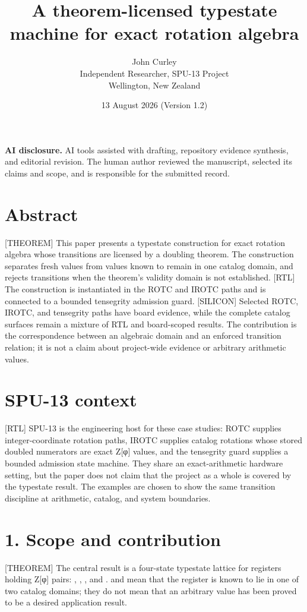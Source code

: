 \documentclass[11pt]{article}
\title{A theorem-licensed typestate machine for exact rotation algebra}
\author{John Curley\\Independent Researcher, SPU-13 Project\\Wellington, New Zealand}
\date{13 August 2026 (Version 1.2)}
\begin{document}
\maketitle
\noindent\textbf{AI disclosure.} AI tools assisted with drafting, repository evidence synthesis, and editorial revision. The human author reviewed the manuscript, selected its claims and scope, and is responsible for the submitted record.

\section{Abstract}

[THEOREM] This paper presents a typestate construction for exact rotation algebra whose transitions are licensed by a doubling theorem. The construction separates fresh values from values known to remain in one catalog domain, and rejects transitions when the theorem's validity domain is not established. [RTL] The construction is instantiated in the ROTC and IROTC paths and is connected to a bounded tensegrity admission guard. [SILICON] Selected ROTC, IROTC, and tensegrity paths have board evidence, while the complete catalog surfaces remain a mixture of RTL and board-scoped results. The contribution is the correspondence between an algebraic domain and an enforced transition relation; it is not a claim about project-wide evidence or arbitrary arithmetic values.

\section{SPU-13 context}

[RTL] SPU-13 is the engineering host for these case studies: ROTC supplies integer-coordinate rotation paths, IROTC supplies catalog rotations whose stored doubled numerators are exact Z[φ] values, and the tensegrity guard supplies a bounded admission state machine. They share an exact-arithmetic hardware setting, but the paper does not claim that the project as a whole is covered by the typestate result. The examples are chosen to show the same transition discipline at arithmetic, catalog, and system boundaries.

\section{1. Scope and contribution}

[THEOREM] The central result is a four-state typestate lattice for registers holding Z[φ] pairs: , , , and .  and  mean that the register is known to lie in one of two catalog domains; they do not mean that an arbitrary value has been proved to be a desired application result.
\end{document}
